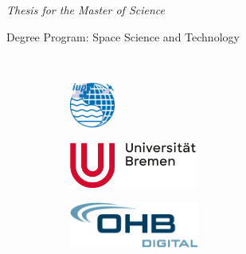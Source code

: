 \begin{titlingpage} %
\thispagestyle{empty} 
\begin{center}
\begin{large}
  \textit{Thesis for the Master of Science}\\
\end{large}
\vspace{1cm}Degree Program: Space Science and Technology\\ \vspace{1cm} 
\vspace{4cm} %
\begin{large} 
\onehalfspacing%
\textbf{\thetitle}\\
\end{large}
\vspace{2.5cm}
\theauthor%
\vspace{1cm} %
\vspace{\fill} %
\begin{figure}[!b]
  \begin{subfigure}{0.15\textwidth}
    \includegraphics[height=1.5cm]{img/res/logoIUP.png}
  \end{subfigure}
  \begin{subfigure}{0.3\textwidth}
    \includegraphics[height=1.5cm]{img/res/logo.png}
  \end{subfigure}\hspace{0.20\textwidth} 
  \begin{subfigure}{0.35\textwidth}
    \centering
    \includegraphics[height=1.5cm]{img/res/logo_ohb_digital.png}
  \end{subfigure}
\end{figure}
\end{center}
\end{titlingpage}
